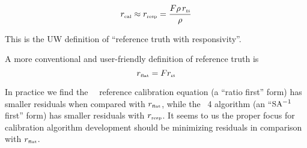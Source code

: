 \documentclass[12pt]{article}
\begin{document}
\begin{equation}
  r_{\mbox{\tiny cal}} \approx r_{\mbox{\tiny resp}} = \frac{F\rho \, r_{\mbox{\tiny\textsc{es}}}}{\rho}
\end{equation} 

\noindent
This is the UW definition of ``reference truth with responsivity''.

A more conventional and user-friendly definition of reference truth
is
\begin{equation}
  r_{\mbox{\tiny flat}} =  F r_{\mbox{\tiny\textsc{es}}}
\end{equation} 

\noindent
In practice we find the \umbc\ \ccast\ reference calibration
equation (a ``ratio first'' form) has smaller residuals when
compared with $r_{\mbox{\tiny flat}}$, while the \noaa\ 4 algorithm (an
``$\mbox{\small SA}^{-1}$ first'' form) has smaller residuals with $r_{\mbox{\tiny resp}}$.  
It seems to us the proper focus for calibration algorithm
development should be minimizing residuals in comparison with
$r_{\mbox{\tiny flat}}$.
\end{document}
